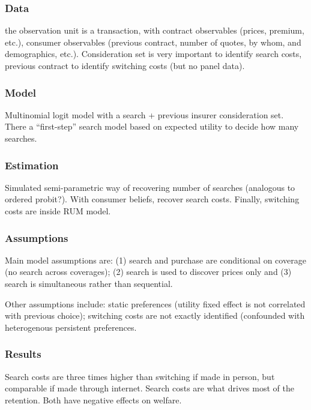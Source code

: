 \subsubsection{Data}

the observation unit is a transaction, with contract observables (prices, premium, etc.), consumer observables (previous contract, number of quotes, by whom, and demographics, etc.). Consideration set is very important to identify search costs, previous contract to identify switching costs (but no panel data).

\subsubsection{Model}

Multinomial logit model with a search + previous insurer consideration set. There a ``first-step'' search model based on expected utility to decide how many searches.

\subsubsection{Estimation}

Simulated semi-parametric way of recovering number of searches (analogous to ordered probit?). With consumer beliefs, recover search costs. Finally, switching costs are inside RUM model.

\subsubsection{Assumptions}

Main model assumptions are: (1) search and purchase are conditional on coverage (no search across coverages); (2) search is used to discover prices only and (3) search is simultaneous rather than sequential.

Other assumptions include: static preferences (utility fixed effect is not correlated with previous choice); switching costs are not exactly identified (confounded with heterogenous persistent preferences.

\subsubsection{Results}

Search costs are three times higher than switching if made in person, but comparable if made through internet. Search costs are what drives most of the retention. Both have negative effects on welfare.